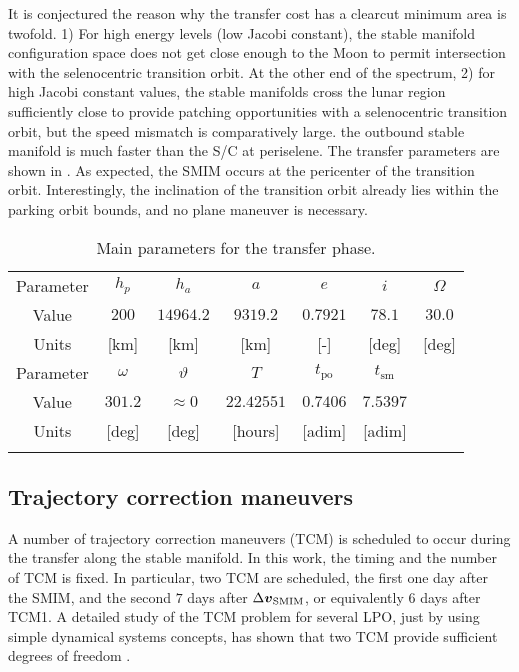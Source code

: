 It is conjectured the reason why the transfer cost has a clearcut minimum area is twofold. 1) For high energy levels (\ie low Jacobi constant), the stable manifold configuration space does not get close enough to the Moon to permit intersection with the selenocentric transition orbit. At the other end of the spectrum, 2) for high Jacobi constant values, the stable manifolds cross the lunar region sufficiently close to provide patching opportunities with a selenocentric transition orbit, but the speed mismatch is comparatively large. \Ie the outbound stable manifold is much faster than the S/C at periselene. The transfer parameters are shown in . As expected, the {SMIM} occurs at the pericenter of the transition orbit. Interestingly, the inclination of the transition orbit already lies within the parking orbit bounds, and no plane maneuver is necessary.
%
\begin{table}[h!]
	\caption{Main parameters for the transfer phase.}
	\label{tab:TranferParameters}
	\centering
	\scriptsize
	\begin{tabular}{ccccccc}
		\TOPlines
		Parameter & $h_p$ & $h_a$ & $a$ & $e$ & $i$ & $\Omega$ \\
		Value & $200$ & $14964.2$ & $9319.2$ & $0.7921$ & $78.1$ & $30.0$ \\ 
		Units & [km] & [km] & [km] & [-] & [deg] & [deg] \\
		\MIDline
		Parameter & $\omega$ & $\vartheta$ & $T$ & $t_{\textrm{po}}$ & $t_{\textrm{sm}}$ & \\
		Value & $301.2$ & $\approx0$ & $22.42551$ & $0.7406$ & $7.5397$ & \\
		Units & [deg] & [deg] & [hours] & [adim] & [adim] & \\
		\BOTTOMlines
	\end{tabular}
\end{table}
%

\subsection{Trajectory correction maneuvers}\label{subsec:Monte Carlo analysis for TCMs scheduling}
A number of trajectory correction maneuvers (TCM) is scheduled to occur during the transfer along the stable manifold. In this work, the timing and the number of {TCM} is fixed. In particular, two {TCM} are scheduled, the first one day after the {SMIM}, and the second $7$ days after $\Delta\boldsymbol{v}_{\textrm{SMIM}}$, or equivalently $6$ days after TCM1. A detailed study of the TCM problem for several {LPO}, just by using simple dynamical systems concepts, has shown that two {TCM} provide sufficient degrees of freedom \cite{gomez2005TCM}.

